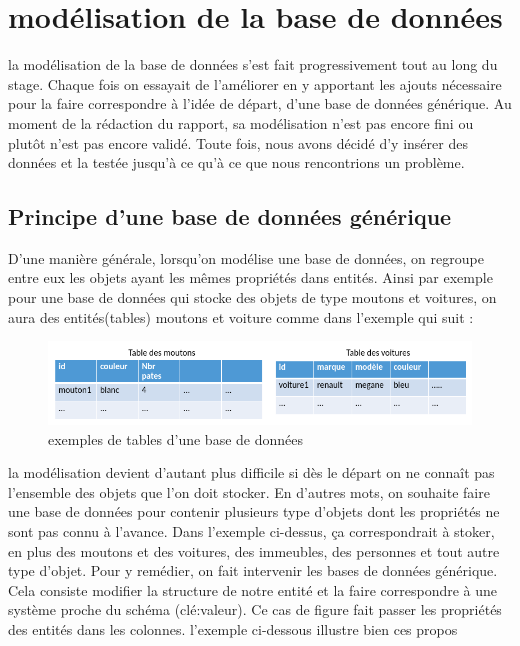 \section{modélisation de la base de données}
la modélisation de la base de données s'est fait progressivement tout au long du stage. Chaque fois on essayait de l'améliorer en y apportant les ajouts nécessaire pour la faire correspondre à l'idée de départ, d'une base de données générique. Au moment de la rédaction du rapport, sa modélisation n'est pas encore fini ou plutôt n'est pas encore validé. Toute fois, nous avons décidé d'y insérer des données et la testée jusqu'à ce qu'à ce que nous rencontrions un problème.
\subsection{Principe d'une base de données générique}
D'une manière générale, lorsqu'on modélise une base de données, on regroupe entre eux les objets ayant les mêmes propriétés dans entités. Ainsi par exemple pour une base de données qui stocke des objets de type moutons et voitures, on aura des entités(tables) moutons et voiture comme dans l'exemple qui suit : 

\begin{figure}[h!]
\begin{center}
\includegraphics[width=1\textwidth]{images/bd_image1.png}
\end{center}
\caption{exemples de tables d'une base de données}
\label{exemples de tables d'une base de données}
\end{figure}

la modélisation devient d'autant plus difficile si dès le départ on ne connaît pas l'ensemble des objets que l'on doit stocker. En d'autres mots, on souhaite faire une base de données pour contenir plusieurs type d'objets dont les propriétés ne sont pas connu à l'avance. Dans l'exemple ci-dessus, ça correspondrait à stoker, en plus des moutons et des voitures, des immeubles, des personnes et tout autre type d'objet. Pour y remédier, on fait intervenir les bases de données générique. Cela consiste modifier la structure de notre entité et la faire correspondre à une système proche du schéma (clé:valeur). Ce cas de figure fait passer les propriétés des entités dans les colonnes.
l'exemple ci-dessous illustre bien ces propos

